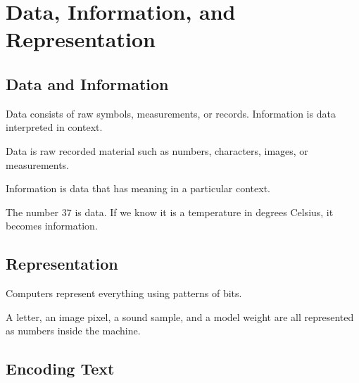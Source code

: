 \chapter{Data, Information, and Representation}
\label{chap:data-information-representation}



\section{Data and Information}

Data consists of raw symbols, measurements, or records. Information is data interpreted in context.

\begin{definition}
Data is raw recorded material such as numbers, characters, images, or measurements.
\end{definition}

\begin{definition}
Information is data that has meaning in a particular context.
\end{definition}

The number \(37\) is data. If we know it is a temperature in degrees Celsius, it becomes information.

\section{Representation}

Computers represent everything using patterns of bits.

A letter, an image pixel, a sound sample, and a model weight are all represented as numbers inside the machine.

\section{Encoding Text}

